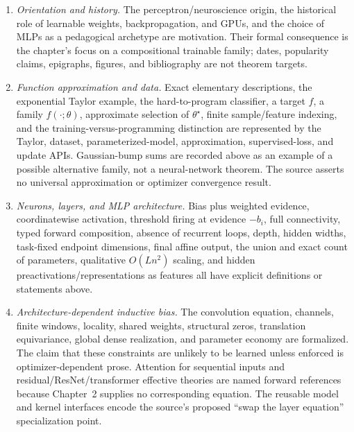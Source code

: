 \begin{enumerate}
  \item \emph{Orientation and history.}  The perceptron/neuroscience origin, the historical role of
    learnable weights, backpropagation, and GPUs, and the choice of MLPs as a pedagogical archetype
    are motivation.  Their formal consequence is the chapter's focus on a compositional trainable
    family; dates, popularity claims, epigraphs, figures, and bibliography are not theorem targets.

  \item \emph{Function approximation and data.}  Exact elementary descriptions, the exponential
    Taylor example, the hard-to-program classifier, a target $f$, a family
    $f(\mathord\cdot;\theta)$, approximate selection of $\theta^\star$, finite sample/feature
    indexing, and the training-versus-programming distinction are represented by the Taylor,
    dataset, parameterized-model, approximation, supervised-loss, and update APIs.  Gaussian-bump
    sums are recorded above as an example of a possible alternative family, not a neural-network
    theorem.  The source asserts no universal approximation or optimizer convergence result.

  \item \emph{Neurons, layers, and MLP architecture.}  Bias plus weighted evidence, coordinatewise
    activation, threshold firing at evidence $-b_i$, full connectivity, typed forward composition,
    absence of recurrent loops, depth, hidden widths, task-fixed endpoint dimensions, final affine
    output, the union and exact count of parameters, qualitative $O(Ln^2)$ scaling, and hidden
    preactivations/representations as features all have explicit definitions or statements above.

  \item \emph{Architecture-dependent inductive bias.}  The convolution equation, channels,
    finite windows, locality, shared weights, structural zeros, translation equivariance, global
    dense realization, and parameter economy are formalized.  The claim that these constraints are
    unlikely to be learned unless enforced is optimizer-dependent prose.  Attention for sequential
    inputs and residual/ResNet/transformer effective theories are named forward references because
    Chapter~2 supplies no corresponding equation.  The reusable model and kernel interfaces encode
    the source's proposed ``swap the layer equation'' specialization point.


\end{enumerate}
